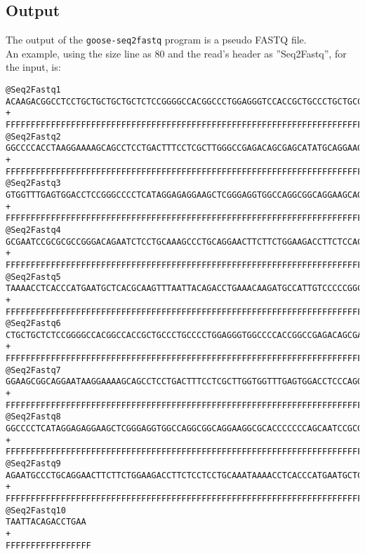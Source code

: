\subsection*{Output}
The output of the \texttt{goose-seq2fastq} program is a pseudo FASTQ file.\\
An example, using the size line as 80 and the read's header as ''Seq2Fastq'', for the input, is:
\begin{lstlisting}
@Seq2Fastq1
ACAAGACGGCCTCCTGCTGCTGCTGCTCTCCGGGGCCACGGCCCTGGAGGGTCCACCGCTGCCCTGCTGCCATTGTCCCC
+
FFFFFFFFFFFFFFFFFFFFFFFFFFFFFFFFFFFFFFFFFFFFFFFFFFFFFFFFFFFFFFFFFFFFFFFFFFFFFFFF
@Seq2Fastq2
GGCCCCACCTAAGGAAAAGCAGCCTCCTGACTTTCCTCGCTTGGGCCGAGACAGCGAGCATATGCAGGAAGCGGCAGGAA
+
FFFFFFFFFFFFFFFFFFFFFFFFFFFFFFFFFFFFFFFFFFFFFFFFFFFFFFFFFFFFFFFFFFFFFFFFFFFFFFFF
@Seq2Fastq3
GTGGTTTGAGTGGACCTCCGGGCCCCTCATAGGAGAGGAAGCTCGGGAGGTGGCCAGGCGGCAGGAAGCAGGCCAGTGCC
+
FFFFFFFFFFFFFFFFFFFFFFFFFFFFFFFFFFFFFFFFFFFFFFFFFFFFFFFFFFFFFFFFFFFFFFFFFFFFFFFF
@Seq2Fastq4
GCGAATCCGCGCGCCGGGACAGAATCTCCTGCAAAGCCCTGCAGGAACTTCTTCTGGAAGACCTTCTCCACCCCCCCAGC
+
FFFFFFFFFFFFFFFFFFFFFFFFFFFFFFFFFFFFFFFFFFFFFFFFFFFFFFFFFFFFFFFFFFFFFFFFFFFFFFFF
@Seq2Fastq5
TAAAACCTCACCCATGAATGCTCACGCAAGTTTAATTACAGACCTGAAACAAGATGCCATTGTCCCCCGGCCTCCTGCTG
+
FFFFFFFFFFFFFFFFFFFFFFFFFFFFFFFFFFFFFFFFFFFFFFFFFFFFFFFFFFFFFFFFFFFFFFFFFFFFFFFF
@Seq2Fastq6
CTGCTGCTCTCCGGGGCCACGGCCACCGCTGCCCTGCCCCTGGAGGGTGGCCCCACCGGCCGAGACAGCGAGCATATGCA
+
FFFFFFFFFFFFFFFFFFFFFFFFFFFFFFFFFFFFFFFFFFFFFFFFFFFFFFFFFFFFFFFFFFFFFFFFFFFFFFFF
@Seq2Fastq7
GGAAGCGGCAGGAATAAGGAAAAGCAGCCTCCTGACTTTCCTCGCTTGGTGGTTTGAGTGGACCTCCCAGGCCAGTGCCG
+
FFFFFFFFFFFFFFFFFFFFFFFFFFFFFFFFFFFFFFFFFFFFFFFFFFFFFFFFFFFFFFFFFFFFFFFFFFFFFFFF
@Seq2Fastq8
GGCCCCTCATAGGAGAGGAAGCTCGGGAGGTGGCCAGGCGGCAGGAAGGCGCACCCCCCCAGCAATCCGCGCGCCGGGAC
+
FFFFFFFFFFFFFFFFFFFFFFFFFFFFFFFFFFFFFFFFFFFFFFFFFFFFFFFFFFFFFFFFFFFFFFFFFFFFFFFF
@Seq2Fastq9
AGAATGCCCTGCAGGAACTTCTTCTGGAAGACCTTCTCCTCCTGCAAATAAAACCTCACCCATGAATGCTCACGCAAGTT
+
FFFFFFFFFFFFFFFFFFFFFFFFFFFFFFFFFFFFFFFFFFFFFFFFFFFFFFFFFFFFFFFFFFFFFFFFFFFFFFFF
@Seq2Fastq10
TAATTACAGACCTGAA
+
FFFFFFFFFFFFFFFFF
\end{lstlisting}
